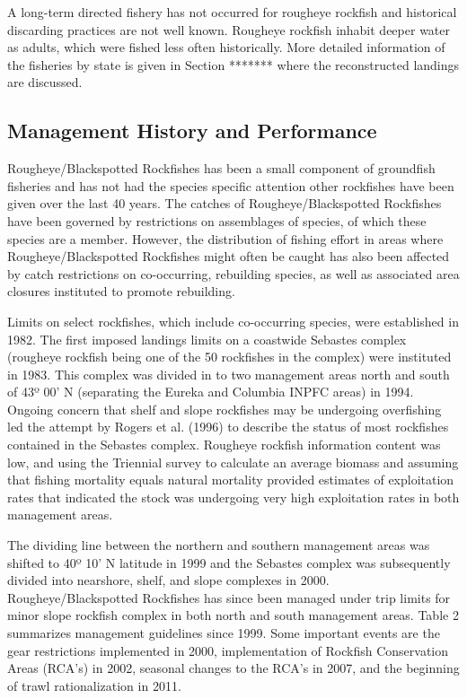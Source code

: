 \documentclass[
]{scrartcl}
\begin{document}
A long-term directed fishery has not occurred for rougheye rockfish and
historical discarding practices are not well known. Rougheye rockfish
inhabit deeper water as adults, which were fished less often
historically. More detailed information of the fisheries by state is
given in Section ******* where the reconstructed landings are discussed.

\subsection{Management History and
Performance}\label{management-history-and-performance}

Rougheye/Blackspotted Rockfishes has been a small component of
groundfish fisheries and has not had the species specific attention
other rockfishes have been given over the last 40 years. The catches of
Rougheye/Blackspotted Rockfishes have been governed by restrictions on
assemblages of species, of which these species are a member. However,
the distribution of fishing effort in areas where Rougheye/Blackspotted
Rockfishes might often be caught has also been affected by catch
restrictions on co-occurring, rebuilding species, as well as associated
area closures instituted to promote rebuilding.

Limits on select rockfishes, which include co-occurring species, were
established in 1982. The first imposed landings limits on a coastwide
Sebastes complex (rougheye rockfish being one of the 50 rockfishes in
the complex) were instituted in 1983. This complex was divided in to two
management areas north and south of 43º 00' N (separating the Eureka and
Columbia INPFC areas) in 1994. Ongoing concern that shelf and slope
rockfishes may be undergoing overfishing led the attempt by Rogers et
al. (1996) to describe the status of most rockfishes contained in the
Sebastes complex. Rougheye rockfish information content was low, and
using the Triennial survey to calculate an average biomass and assuming
that fishing mortality equals natural mortality provided estimates of
exploitation rates that indicated the stock was undergoing very high
exploitation rates in both management areas.

The dividing line between the northern and southern management areas was
shifted to 40º 10' N latitude in 1999 and the Sebastes complex was
subsequently divided into nearshore, shelf, and slope complexes in 2000.
Rougheye/Blackspotted Rockfishes has since been managed under trip
limits for minor slope rockfish complex in both north and south
management areas. Table 2 summarizes management guidelines since 1999.
Some important events are the gear restrictions implemented in 2000,
implementation of Rockfish Conservation Areas (RCA's) in 2002, seasonal
changes to the RCA's in 2007, and the beginning of trawl rationalization
in 2011.
\end{document}
